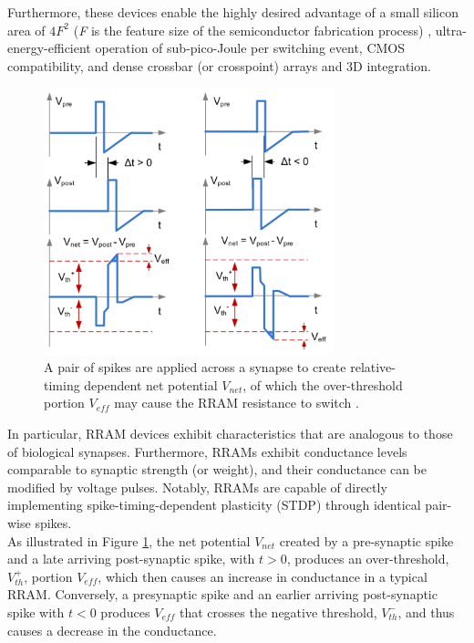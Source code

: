 \noindent  Furthermore, these devices enable the highly desired advantage of a small silicon area of $4F^2$ (\textit{F} is the feature size of the semiconductor fabrication process) \cite{chen2016review}, ultra-energy-efficient operation of sub-pico-Joule per switching event, CMOS compatibility, and dense crossbar (or crosspoint) arrays and 3D integration.\\

\begin{figure}[htbp!] 
    \centering    
    \includegraphics[width=0.75\textwidth]{Chapter6/Figs/f.png}
    \caption[A pair of spikes are applied across a synapse to create relative-timing dependent net potential.]{A pair of spikes are applied across a synapse to create relative-timing dependent net potential $V_{net}$, of which the over-threshold portion $V_{eff}$ may cause the RRAM resistance to switch \cite{wu2017enabling}.}
    \label{fig:6f}
\end{figure}

\noindent In particular, RRAM devices exhibit characteristics that are analogous to those of biological synapses. Furthermore, RRAMs exhibit conductance levels comparable to synaptic strength (or weight), and their conductance can be modified by voltage pulses. Notably, RRAMs are capable of directly implementing spike-timing-dependent plasticity (STDP) through identical pair-wise spikes. \\

\noindent As illustrated in Figure \ref{fig:6f}, the net potential $V_{net}$ created by a pre-synaptic spike and a late arriving post-synaptic spike, with $t > 0$, produces an over-threshold, $V_{th}^+$, portion $V_{eff}$, which then causes an increase in conductance in a typical RRAM. Conversely, a presynaptic spike and an earlier arriving post-synaptic spike with $t < 0$ produces $V_{eff}$ that crosses the negative threshold, $V_{th}^-$, and thus causes a decrease in the conductance. \\

